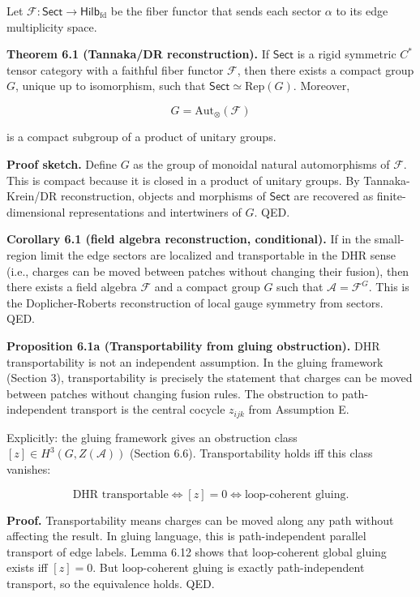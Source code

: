Let \(\mathcal F: \mathsf{Sect} \to \mathsf{Hilb}_{\mathrm{fd}}\) be the fiber functor that sends each sector \(\alpha\) to its edge multiplicity space.

\textbf{Theorem 6.1 (Tannaka/DR reconstruction).} If \(\mathsf{Sect}\) is a rigid symmetric \(C^*\) tensor category with a faithful fiber functor \(\mathcal F\), then there exists a compact group \(G\), unique up to isomorphism, such that \(\mathsf{Sect} \simeq \mathrm{Rep}(G)\). Moreover,

\[
G = \mathrm{Aut}_\otimes(\mathcal F)
\]

is a compact subgroup of a product of unitary groups.

\textbf{Proof sketch.} Define \(G\) as the group of monoidal natural automorphisms of \(\mathcal F\). This is compact because it is closed in a product of unitary groups. By Tannaka-Krein/DR reconstruction, objects and morphisms of \(\mathsf{Sect}\) are recovered as finite-dimensional representations and intertwiners of \(G\). QED.

\textbf{Corollary 6.1 (field algebra reconstruction, conditional).} If in the small-region limit the edge sectors are localized and transportable in the DHR sense (i.e., charges can be moved between patches without changing their fusion), then there exists a field algebra \(\mathcal F\) and a compact group \(G\) such that \(\mathcal A = \mathcal F^G\). This is the Doplicher-Roberts reconstruction of local gauge symmetry from sectors. QED.

\textbf{Proposition 6.1a (Transportability from gluing obstruction).} DHR transportability is not an independent assumption. In the gluing framework (Section 3), transportability is precisely the statement that charges can be moved between patches without changing fusion rules. The obstruction to path-independent transport is the central cocycle \(z_{ijk}\) from Assumption E.

Explicitly: the gluing framework gives an obstruction class \([z] \in H^3(G, Z(\mathcal{A}))\) (Section 6.6). Transportability holds iff this class vanishes:

\[
\text{DHR transportable} \iff [z] = 0 \iff \text{loop-coherent gluing}.
\]

\textbf{Proof.} Transportability means charges can be moved along any path without affecting the result. In gluing language, this is path-independent parallel transport of edge labels. Lemma 6.12 shows that loop-coherent global gluing exists iff \([z] = 0\). But loop-coherent gluing is exactly path-independent transport, so the equivalence holds. QED.

